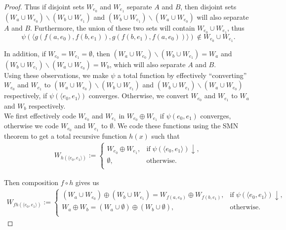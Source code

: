 \documentclass{article}
\begin{document}
\begin{enumerate}[label={\bf Q\arabic*:}]
\begin{enumerate}[label={(\roman*)}]
\begin{proof}
          Thus if disjoint sets $W_{e_0}$ and $W_{e_1}$ separate $A$ and
          $B$, then disjoint sets $(W_a\cup W_{e_0})\backslash(W_b\cup
          W_{e_1})$ and $(W_b\cup W_{e_1})\backslash(W_a\cup W_{e_0})$ will
          also separate $A$ and $B$. Furthermore, the union of these two
          sets will contain $W_{e_0}\cup W_{e_1}$, thus
          \[\psi(\langle g(f(a,e_0),f(b,e_1)), g(f(b,e_1),f(a,e_0))\rangle)
          \not\in W_{e_0}\cup W_{e_1}.\]

          In addition, if $W_{e_0}=W_{e_1}=\emptyset$, then $(W_a\cup
          W_{e_0})\backslash(W_b\cup W_{e_1})=W_a$ and $(W_b\cup
          W_{e_1})\backslash(W_a\cup W_{e_0})=W_b$, which will also
          separate $A$ and $B$. \\

          Using these observations, we make $\psi$ a total function by
          effectively ``converting'' $W_{e_0}$ and $W_{e_1}$ to $(W_a\cup
          W_{e_0})\backslash(W_b\cup W_{e_1})$ and $(W_b\cup
          W_{e_1})\backslash(W_a\cup W_{e_0})$ respectively, if
          $\psi(\langle e_0,e_1\rangle)$ converges.  Otherwise, we convert
          $W_{e_0}$ and $W_{e_1}$ to $W_a$ and $W_b$ respectively. \\

          We first effectively code $W_{e_0}$ and $W_{e_1}$
          in $W_{e_0}\oplus W_{e_1}$ if $\psi(e_0,e_1)$ converges,
          otherwise we code $W_{e_0}$ and $W_{e_1}$ to $\emptyset$. We code
          these functions using the SMN theorem to get a total recursive
          function $h(x)$ such that
          \begin{align*}
            W_{h(\langle e_0,e_1\rangle)} :=
            \begin{cases}
              W_{e_0}\oplus W_{e_1}, &\text{if}\; \psi(\langle
                e_0,e_1\rangle)\downarrow,\\
              \emptyset, &\text{otherwise}.\\
            \end{cases}
          \end{align*}

          Then composition $f\circ h$ gives us
          \begin{align*}
            W_{fh(\langle e_0,e_1\rangle)} :=
            \begin{cases}
              (W_a\cup W_{e_0})\oplus(W_b\cup W_{e_1})
                =W_{f(a,e_0)}\oplus W_{f(b,e_1)}, &\text{if}\; \psi(\langle
                e_0,e_1\rangle)\downarrow,\\
              W_a\oplus W_b =(W_a\cup\emptyset)\oplus(W_b\cup\emptyset),
                &\text{otherwise}.\\
            \end{cases}
          \end{align*}


\end{proof}
\end{enumerate}
\end{enumerate}
\end{document}
